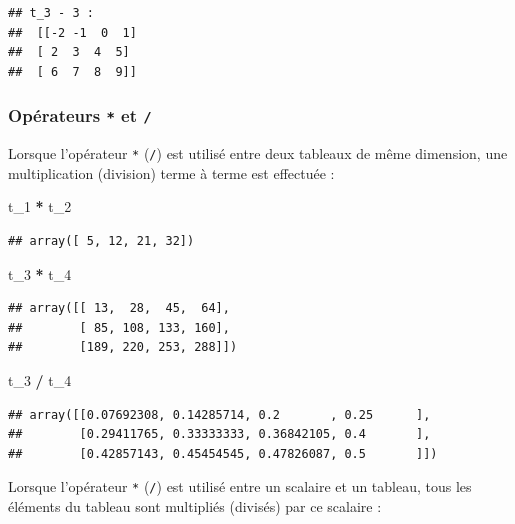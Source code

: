 \documentclass[
  12pt,
]{book}
\newenvironment{Shaded}{\begin{snugshade}}{\end{snugshade}}
\newcommand{\NormalTok}[1]{#1}
\newcommand{\OperatorTok}[1]{\textcolor[rgb]{0.81,0.36,0.00}{\textbf{#1}}}
\numberwithin{equation}{section}
\numberwithin{countremarque}{section}
\begin{document}
\begin{lstlisting}
## t_3 - 3 : 
##  [[-2 -1  0  1]
##  [ 2  3  4  5]
##  [ 6  7  8  9]]
\end{lstlisting}

\subsubsection{\texorpdfstring{Opérateurs \texttt{*} et \texttt{/}}{Opérateurs * et /}}\label{opuxe9rateurs-et}

Lorsque l'opérateur \texttt{*} (\texttt{/}) est utilisé entre deux tableaux de même dimension, une multiplication (division) terme à terme est effectuée :

\begin{Shaded}
\begin{Highlighting}[]
\NormalTok{t\_1 }\OperatorTok{*}\NormalTok{ t\_2}
\end{Highlighting}
\end{Shaded}

\begin{lstlisting}
## array([ 5, 12, 21, 32])
\end{lstlisting}

\begin{Shaded}
\begin{Highlighting}[]
\NormalTok{t\_3 }\OperatorTok{*}\NormalTok{ t\_4}
\end{Highlighting}
\end{Shaded}

\begin{lstlisting}
## array([[ 13,  28,  45,  64],
##        [ 85, 108, 133, 160],
##        [189, 220, 253, 288]])
\end{lstlisting}

\begin{Shaded}
\begin{Highlighting}[]
\NormalTok{t\_3 }\OperatorTok{/}\NormalTok{ t\_4}
\end{Highlighting}
\end{Shaded}

\begin{lstlisting}
## array([[0.07692308, 0.14285714, 0.2       , 0.25      ],
##        [0.29411765, 0.33333333, 0.36842105, 0.4       ],
##        [0.42857143, 0.45454545, 0.47826087, 0.5       ]])
\end{lstlisting}

Lorsque l'opérateur \texttt{*} (\texttt{/}) est utilisé entre un scalaire et un tableau, tous les éléments du tableau sont multipliés (divisés) par ce scalaire :
\end{document}
